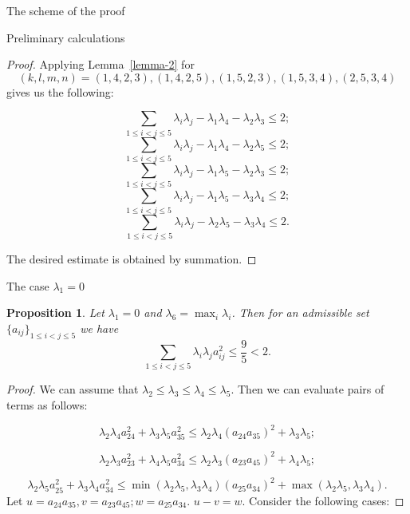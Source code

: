 \documentclass[12pt]{article}
\newtheorem{proposition}{Proposition}[section]
\begin{document}
\begin{section}{The scheme of the proof}
\begin{section}{Preliminary calculations}
    \begin{proof}
        Applying Lemma~\ref{lemma-2} for $$(k,l,m,n) = (1,4,2,3),
        (1,4,2,5),(1,5,2,3), (1,5,3,4), (2,5,3,4)$$ gives us the following:

        $$
            \sum_{1\leq i<j\leq 5}\lambda_{i}\lambda_{j} - \lambda_{1}\lambda_{4} - \lambda_{2}\lambda_{3}\leq 2;
        $$
        $$
            \sum_{1\leq i<j\leq 5}\lambda_{i}\lambda_{j} - \lambda_{1}\lambda_{4} - \lambda_{2}\lambda_{5}\leq 2;
        $$
        $$
            \sum_{1\leq i<j\leq 5}\lambda_{i}\lambda_{j} - \lambda_{1}\lambda_{5} - \lambda_{2}\lambda_{3}\leq 2;
        $$
        $$
            \sum_{1\leq i<j\leq 5}\lambda_{i}\lambda_{j} - \lambda_{1}\lambda_{5} - \lambda_{3}\lambda_{4}\leq 2;
        $$
        $$
            \sum_{1\leq i<j\leq 5}\lambda_{i}\lambda_{j} - \lambda_{2}\lambda_{5} - \lambda_{3}\lambda_{4}\leq 2.
        $$

        The desired estimate is obtained by summation.
        
    \end{proof}
    
    
\end{section}



\begin{section}{The case  \texorpdfstring{$\lambda_{1} = 0$}{Lg}}
\label{s5}

\begin{proposition}
\label{lambda-zero-case}
    Let $  \lambda_{1}=0$ and $\lambda_{6} = \max_{i}\lambda_{i}$. Then for an admissible set $\{a_{ij}\}_{1\leq i<j\leq 5}$ we have
    $$
        \sum_{1\leq i < j\leq 5}\lambda_{i}\lambda_{j} a_{ij}^{2} \leq \frac{9}{5}<2.
    $$
\end{proposition}

\begin{proof}
    We can assume that $\lambda_{2}\leq \lambda_{3}\leq \lambda_{4} \leq \lambda_{5}.$  Then we can evaluate pairs of terms as follows:
    
    $$
        \lambda_{2}\lambda_{4}a_{24}^{2} + \lambda_{3}\lambda_{5}a_{35}^{2} \leq \lambda_{2}\lambda_{4}(a_{24}a_{35})^{2} + \lambda_{3}\lambda_{5};
    $$

       $$
        \lambda_{2}\lambda_{3}a_{23}^{2} + \lambda_{4}\lambda_{5}a_{34}^{2} \leq \lambda_{2}\lambda_{3}(a_{23}a_{45})^{2} + \lambda_{4}\lambda_{5};
    $$

    $$
        \lambda_{2}\lambda_{5}a_{25}^{2} + \lambda_{3}\lambda_{4}a_{34}^{2} \leq \min(\lambda_{2}\lambda_{5},\lambda_{3}\lambda_{4} )(a_{25}a_{34})^{2} + \max(\lambda_{2}\lambda_{5},\lambda_{3}\lambda_{4} ).
    $$
    Let $u=a_{24}a_{35}, v = a_{23}a_{45}; w = a_{25}a_{34}.$ $u-v=w.$  Consider the following cases:
    

\end{proof}
\end{section}
\end{section}
\end{document}
